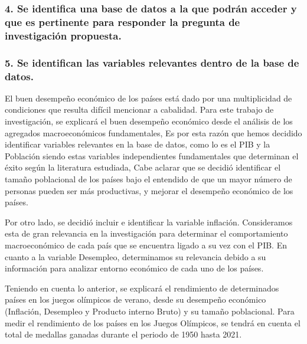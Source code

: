 \documentclass[
]{article}
\begin{document}
\hypertarget{se-identifica-una-base-de-datos-a-la-que-podruxe1n-acceder-y-que-es-pertinente-para-responder-la-pregunta-de-investigaciuxf3n-propuesta.}{%
\subsubsection{\texorpdfstring{\textbf{4.} Se identifica una base de
datos a la que podrán acceder y que es pertinente para responder la
pregunta de investigación
propuesta.}{4. Se identifica una base de datos a la que podrán acceder y que es pertinente para responder la pregunta de investigación propuesta.}}\label{se-identifica-una-base-de-datos-a-la-que-podruxe1n-acceder-y-que-es-pertinente-para-responder-la-pregunta-de-investigaciuxf3n-propuesta.}}

\hypertarget{se-identifican-las-variables-relevantes-dentro-de-la-base-de-datos.}{%
\subsubsection{\texorpdfstring{\textbf{5.} Se identifican las variables
relevantes dentro de la base de
datos.}{5. Se identifican las variables relevantes dentro de la base de datos.}}\label{se-identifican-las-variables-relevantes-dentro-de-la-base-de-datos.}}

El buen desempeño económico de los países está dado por una
multiplicidad de condiciones que resulta difícil mencionar a cabalidad.
Para este trabajo de investigación, se explicará el buen desempeño
económico desde el análisis de los agregados macroeconómicos
fundamentales, Es por esta razón que hemos decidido identificar
variables relevantes en la base de datos, como lo es el PIB y la
Población siendo estas variables independientes fundamentales que
determinan el éxito según la literatura estudiada, Cabe aclarar que se
decidió identificar el tamaño poblacional de los países bajo el
entendido de que un mayor número de personas pueden ser más productivas,
y mejorar el desempeño económico de los países.

Por otro lado, se decidió incluir e identificar la variable inflación.
Consideramos esta de gran relevancia en la investigación para determinar
el comportamiento macroeconómico de cada país que se encuentra ligado a
su vez con el PIB. En cuanto a la variable Desempleo, determinamos su
relevancia debido a su información para analizar entorno económico de
cada uno de los países.

Teniendo en cuenta lo anterior, se explicará el rendimiento de
determinados países en los juegos olímpicos de verano, desde su
desempeño económico (Inflación, Desempleo y Producto interno Bruto) y su
tamaño poblacional. Para medir el rendimiento de los países en los
Juegos Olímpicos, se tendrá en cuenta el total de medallas ganadas
durante el periodo de 1950 hasta 2021.
\end{document}
